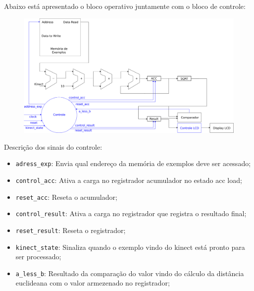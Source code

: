 \newpage

Abaixo está apresentado o bloco operativo juntamente com o bloco de controle:

\begin{figure}[!ht]
\centering
\includegraphics[scale=0.36]{img/circuito_knn.png}
\end{figure}

Descrição dos sinais do controle:

\begin{itemize}

\item \verb|adress_exp|:  Envia qual endereço da memória de exemplos deve ser acessado;
\item \verb|control_acc|: Ativa a carga no registrador acumulador no estado acc load;
\item \verb|reset_acc|: Reseta o acumulador;
\item \verb|control_result|: Ativa a carga no registrador que registra o resultado final;
\item \verb|reset_result|: Reseta o registrador;
\item \verb|kinect_state|: Sinaliza quando o exemplo vindo do kinect está pronto para ser processado;
\item \verb|a_less_b|: Resultado da comparação do valor vindo do cálculo da distância euclideana com o valor armezenado no registrador;
\end{itemize}